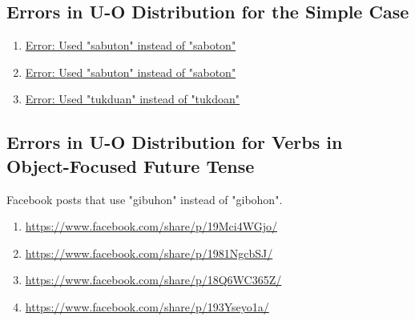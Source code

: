 \subsection{Errors in U-O Distribution for the Simple Case}
\begin{enumerate}
    \item \href{https://www.facebook.com/share/p/1DCJL8KWLr/}{Error: Used "sabuton" instead of "saboton"}
    \item \href{https://www.facebook.com/share/p/1BQBPKzNNE/}{Error: Used "sabuton" instead of "saboton"}
    \item \href{https://www.facebook.com/share/p/163t1N1x1b/}{Error: Used "tukduan" instead of "tukdoan"}
\end{enumerate}

\subsection{Errors in U-O Distribution for Verbs in Object-Focused Future Tense}
Facebook posts that use "gibuhon" instead of "gibohon".
\begin{enumerate}
    \item \url{https://www.facebook.com/share/p/19Mci4WGjo/}
    \item \url{https://www.facebook.com/share/p/1981NgcbSJ/}
    \item \url{https://www.facebook.com/share/p/18Q6WC365Z/}
    \item \url{https://www.facebook.com/share/p/193Yseyo1a/}
\end{enumerate}
